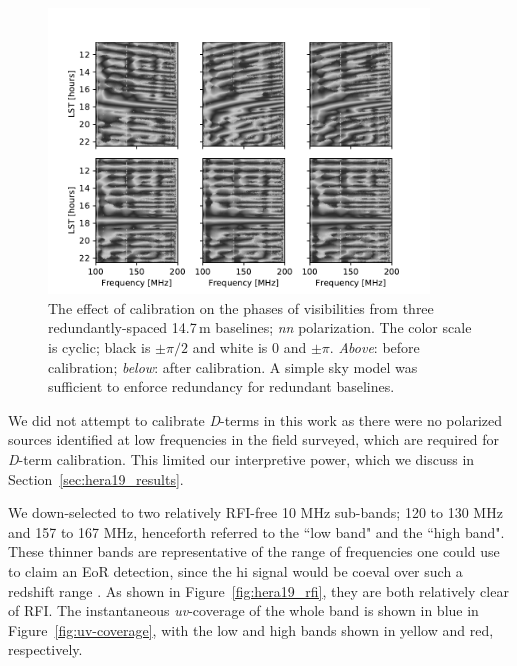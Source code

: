 \begin{figure}
\centering
\includegraphics[width=0.9\textwidth]{chapters/eor_window_HERA/figures/phases_pre_post_abscal_h19_cyclic_grey.pdf}
\caption[The effect of calibration on the phases of visibilities from three redundantly-spaced 14.7\,m baselines.]{The effect of calibration on the phases of visibilities from three redundantly-spaced 14.7\,m baselines; \textit{nn} polarization. The color scale is cyclic; black is $\pm\pi/2$ and white is 0 and $\pm\pi$. \textit{Above}: before calibration; \textit{below}: after calibration. A simple sky model was sufficient to enforce redundancy for redundant baselines.}
\label{fig:hera19_phasecal}
\end{figure}

We did not attempt to calibrate \textit{D}-terms in this work as there were no polarized sources identified at low frequencies in the field surveyed, which are required for \textit{D}-term calibration. This limited our interpretive power, which we discuss in Section~\ref{sec:hera19_results}.

We down-selected to two relatively RFI-free 10 MHz sub-bands; 120 to 130 MHz and 157 to 167 MHz, henceforth referred to the ``low band" and the ``high band". These thinner bands are representative of the range of frequencies one could use to claim an EoR detection, since the {\sc hi} signal would be coeval over such a redshift range \citep{Furlanetto.06}. As shown in Figure~\ref{fig:hera19_rfi}, they are both relatively clear of RFI.
The instantaneous \textit{uv}-coverage of the whole band is shown in blue in Figure~\ref{fig:uv-coverage}, with the low and high bands shown in yellow and red, respectively.

